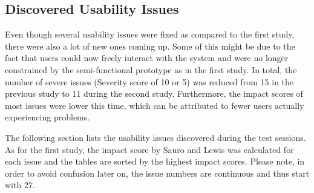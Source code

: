

\subsection{Discovered Usability Issues} \label{sec:discovered-usability-issues}
Even though several usability issues were fixed as compared to the first study, there were also a lot of new ones coming up. Some of this might be due to the fact that users could now freely interact with the system and were no longer constrained by the semi-functional prototype as in the first study. In total, the number of severe issues (Severity score of 10 or 5) was reduced from 15 in the previous study to 11 during the second study. Furthermore, the impact scores of most issues were lower this time, which can be attributed to fewer users actually experiencing problems.

The following section lists the usability issues discovered during the test sessions. As for the first study, the impact score by Sauro and Lewis \cite{sauro_quantifying_2012} was calculated for each issue and the tables are sorted by the highest impact scores. Please note, in order to avoid confusion later on, the issue numbers are continuous and thus start with 27.


